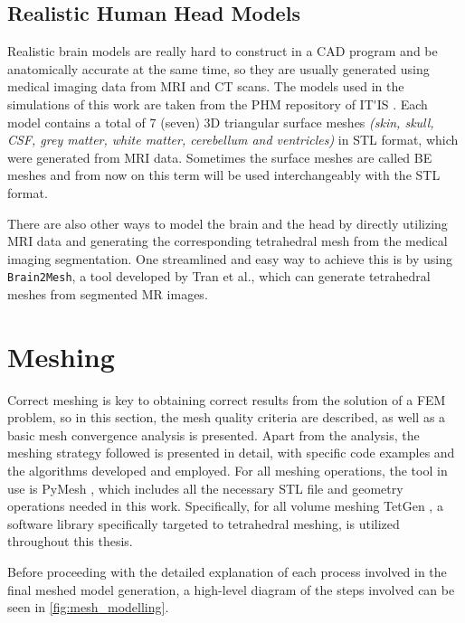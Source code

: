 \subsection{Realistic Human Head Models}
\label{sec:phm_models}

Realistic brain models are really hard to construct in a \gls{CAD} program and be anatomically accurate at the same time, so they are usually generated using medical imaging data from \gls{MRI} and \gls{CT} scans. The models used in the simulations of this work are taken from the \gls{PHM} repository of \gls{IT'IS} \cite{ErikG.Lee2016,Lee2018,ITstissue}. Each model contains a total of 7 (seven) 3D triangular surface meshes \textit{(skin, skull, \gls{CSF}, grey matter, white matter, cerebellum and ventricles)} in \gls{STL} format, which were generated from \gls{MRI} data. Sometimes the surface meshes are called \gls{BE} meshes and from now on this term will be used interchangeably with the \gls{STL} format.

There are also other ways to model the brain and the head by directly utilizing \gls{MRI} data and generating the corresponding tetrahedral mesh from the medical imaging segmentation. One streamlined and easy way to achieve this is by using \texttt{Brain2Mesh}, a tool developed by Tran et al.\cite{Tran2020}, which can generate tetrahedral meshes from segmented \gls{MR} images.

\section{Meshing}
\label{sec:fem_meshing}

Correct meshing is key to obtaining correct results from the solution of a \gls{FEM} problem, so in this section, the mesh quality criteria are described, as well as a basic mesh convergence analysis is presented. Apart from the analysis, the meshing strategy followed is presented in detail, with specific code examples and the algorithms developed and employed. For all meshing operations, the tool in use is PyMesh \cite{pymesh}, which includes all the necessary \gls{STL} file and geometry operations needed in this work. Specifically, for all volume meshing TetGen \cite{tetgen}, a software library specifically targeted to tetrahedral meshing, is utilized throughout this thesis.

Before proceeding with the detailed explanation of each process involved in the final meshed model generation, a high-level diagram of the steps involved can be seen in \autoref{fig:mesh_modelling}.

